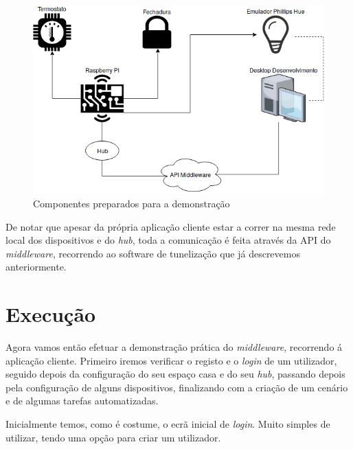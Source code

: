 \begin{figure}[H]
  \centering
        \includegraphics[scale=0.6]{img/demo/setup.png}
  \caption{Componentes preparados para a demonstração}
\end{figure}

De notar que apesar da própria aplicação cliente estar a correr na mesma rede local dos dispositivos e do \textit{hub}, toda a comunicação é feita através da API do \textit{middleware}, recorrendo ao software de tunelização que já descrevemos anteriormente.

\section{Execução}

Agora vamos então efetuar a demonstração prática do \textit{middleware}, recorrendo á aplicação cliente. Primeiro iremos verificar o registo e o \textit{login} de um utilizador, seguido depois da configuração do seu espaço casa e do seu \textit{hub}, passando depois pela configuração de alguns dispositivos, finalizando com a criação de um cenário e de algumas tarefas automatizadas.

Inicialmente temos, como é costume, o ecrã inicial de \textit{login}. Muito simples de utilizar, tendo uma opção para criar um utilizador. 

